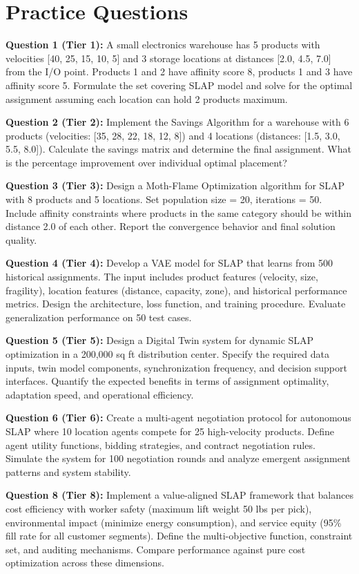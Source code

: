 \documentclass{article}
\begin{document}
\section{Practice Questions}

\textbf{Question 1 (Tier 1):} A small electronics warehouse has 5 products with velocities [40, 25, 15, 10, 5] and 3 storage locations at distances [2.0, 4.5, 7.0] from the I/O point. Products 1 and 2 have affinity score 8, products 1 and 3 have affinity score 5. Formulate the set covering SLAP model and solve for the optimal assignment assuming each location can hold 2 products maximum.

\textbf{Question 2 (Tier 2):} Implement the Savings Algorithm for a warehouse with 6 products (velocities: [35, 28, 22, 18, 12, 8]) and 4 locations (distances: [1.5, 3.0, 5.5, 8.0]). Calculate the savings matrix and determine the final assignment. What is the percentage improvement over individual optimal placement?

\textbf{Question 3 (Tier 3):} Design a Moth-Flame Optimization algorithm for SLAP with 8 products and 5 locations. Set population size = 20, iterations = 50. Include affinity constraints where products in the same category should be within distance 2.0 of each other. Report the convergence behavior and final solution quality.

\textbf{Question 4 (Tier 4):} Develop a VAE model for SLAP that learns from 500 historical assignments. The input includes product features (velocity, size, fragility), location features (distance, capacity, zone), and historical performance metrics. Design the architecture, loss function, and training procedure. Evaluate generalization performance on 50 test cases.

\textbf{Question 5 (Tier 5):} Design a Digital Twin system for dynamic SLAP optimization in a 200,000 sq ft distribution center. Specify the required data inputs, twin model components, synchronization frequency, and decision support interfaces. Quantify the expected benefits in terms of assignment optimality, adaptation speed, and operational efficiency.

\textbf{Question 6 (Tier 6):} Create a multi-agent negotiation protocol for autonomous SLAP where 10 location agents compete for 25 high-velocity products. Define agent utility functions, bidding strategies, and contract negotiation rules. Simulate the system for 100 negotiation rounds and analyze emergent assignment patterns and system stability.

\textbf{Question 8 (Tier 8):} Implement a value-aligned SLAP framework that balances cost efficiency with worker safety (maximum lift weight 50 lbs per pick), environmental impact (minimize energy consumption), and service equity (95\% fill rate for all customer segments). Define the multi-objective function, constraint set, and auditing mechanisms. Compare performance against pure cost optimization across these dimensions.
\end{document}
